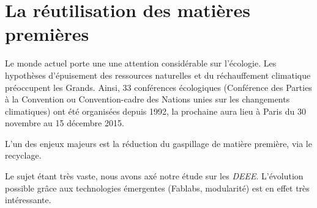 \section{La réutilisation des matières premières}
Le monde actuel porte une une attention considérable sur l'écologie. Les hypothèses d'épuisement des ressources naturelles et du réchauffement climatique préoccupent les Grands. Ainsi, 33 conférences écologiques (Conférence des Parties à la Convention ou Convention-cadre des Nations unies sur les changements climatiques) ont été organisées depuis 1992, la prochaine aura lieu à Paris du  30 novembre au 15 décembre 2015. 

L'un des enjeux majeurs est la réduction du gaspillage de matière première, via le recyclage. 

Le sujet étant très vaste, nous avons axé notre étude sur les \textit{DEEE}. L'évolution possible grâce aux technologies  émergentes (Fablabs, modularité) est en effet très intéressante. 